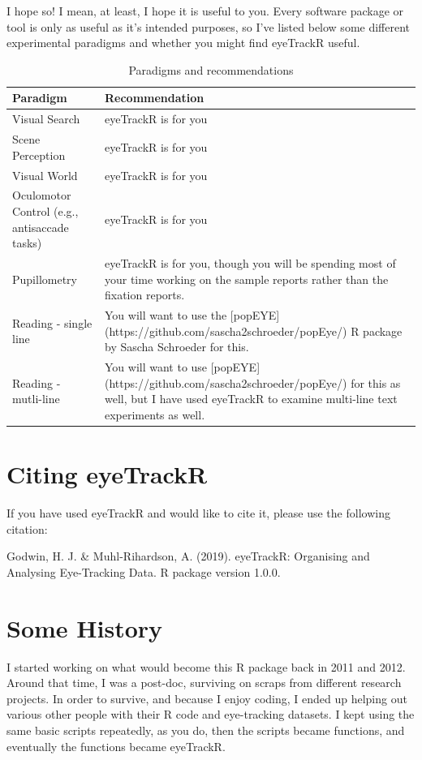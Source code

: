 \documentclass[]{book}
\begin{document}
I hope so! I mean, at least, I hope it is useful to you. Every software package or tool is only as useful as it's intended purposes, so I've listed below some different experimental paradigms and whether you might find eyeTrackR useful.

\begin{table}[t]

\caption{\label{tab:unnamed-chunk-3}Paradigms and recommendations}
\centering
\begin{tabular}{ll}
\toprule
Paradigm & Recommendation\\
\midrule
Visual Search & eyeTrackR is for you\\
Scene Perception & eyeTrackR is for you\\
Visual World & eyeTrackR is for you\\
Oculomotor Control (e.g.,   antisaccade tasks) & eyeTrackR is for you\\
Pupillometry & eyeTrackR is for you, though you will be spending most of your time working on the sample reports rather than the fixation reports.\\
\addlinespace
Reading - single line & You will want to use the [popEYE](https://github.com/sascha2schroeder/popEye/) R package by Sascha Schroeder for this.\\
Reading - mutli-line & You will want to use [popEYE](https://github.com/sascha2schroeder/popEye/) for this as well, but I have used eyeTrackR to examine multi-line text experiments as well.\\
\bottomrule
\end{tabular}
\end{table}

\hypertarget{citing-eyetrackr}{%
\section{Citing eyeTrackR}\label{citing-eyetrackr}}

If you have used eyeTrackR and would like to cite it, please use the following citation:

Godwin, H. J. \& Muhl-Rihardson, A. (2019). eyeTrackR: Organising and Analysing Eye-Tracking Data. R package version 1.0.0.

\hypertarget{some-history}{%
\section{Some History}\label{some-history}}

I started working on what would become this R package back in 2011 and 2012. Around that time, I was a post-doc, surviving on scraps from different research projects. In order to survive, and because I enjoy coding, I ended up helping out various other people with their R code and eye-tracking datasets. I kept using the same basic scripts repeatedly, as you do, then the scripts became functions, and eventually the functions became eyeTrackR.
\end{document}
